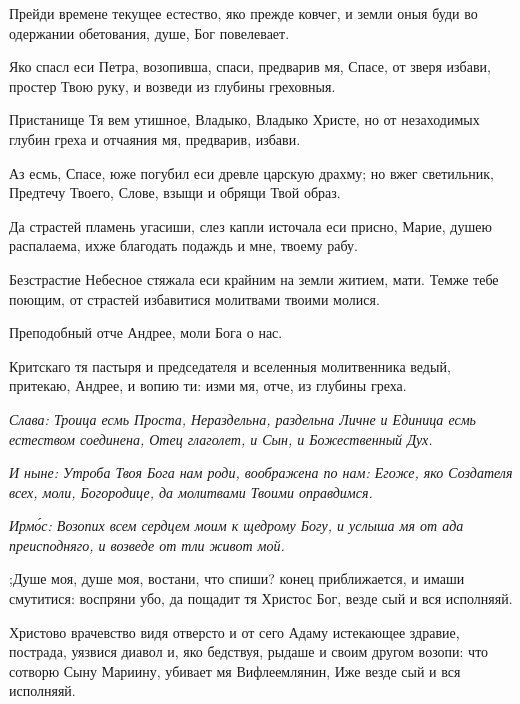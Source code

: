 Прейди времене текущее естество, яко прежде ковчег, и земли оныя буди во одержании обетования, душе, Бог повелевает.

Яко спасл еси Петра, возопивша, спаси, предварив мя, Спасе, от зверя избави, простер Твою руку, и возведи из глубины греховныя.

Пристанище Тя вем утишное, Владыко, Владыко Христе, но от незаходимых глубин греха и отчаяния мя, предварив, избави.

Аз есмь, Спасе, юже погубил еси древле царскую драхму; но вжег светильник, Предтечу Твоего, Слове, взыщи и обрящи Твой образ.


Да страстей пламень угасиши, слез капли источала еси присно, Марие, душею распалаема, ихже благодать подаждь и мне, твоему рабу.


Безстрастие Небесное стяжала еси крайним на земли житием, мати. Темже тебе поющим, от страстей избавитися молитвами твоими молися.

Преподобный отче Андрее, моли Бога о нас.

Критскаго тя пастыря и председателя и вселенныя молитвенника ведый, притекаю, Андрее, и вопию ти: изми мя, отче, из глубины греха.

\itshape Слава\normalfont{}: Троица есмь Проста, Нераздельна, раздельна Личне и Единица есмь естеством соединена, Отец глаголет, и Сын, и Божественный Дух.

\itshape И ныне\normalfont{}: Утроба Твоя Бога нам роди, воображена по нам: Егоже, яко Создателя всех, моли, Богородице, да молитвами Твоими оправдимся.

\itshape Ирм\'{о}с\normalfont{}: Возопих всем сердцем моим к щедрому Богу, и услыша мя от ада преисподняго, и возведе от тли живот мой. 


;Душе моя, душе моя, востани, что спиши? конец приближается, и имаши смутитися: воспряни убо, да пощадит тя Христос Бог, везде сый и вся исполняяй. 


Христово врачевство видя отверсто и от сего Адаму истекающее здравие, пострада, уязвися диавол и, яко бедствуя, рыдаше и своим другом возопи: что сотворю Сыну Мариину, убивает мя Вифлеемлянин, Иже везде сый и вся исполняяй. 

